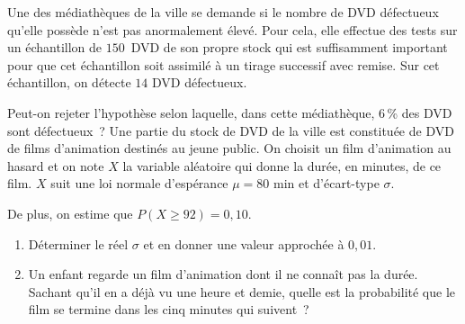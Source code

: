 \bigbreak
{}
\medbreak
Une des médiathèques de la ville se demande si le nombre de DVD défectueux qu'elle possède
n'est pas anormalement élevé. Pour cela, elle effectue des tests sur un échantillon de $150 $~DVD de son propre stock qui est suffisamment important pour que cet échantillon soit assimilé à un tirage successif avec remise. Sur cet échantillon, on détecte $14$ DVD défectueux.
\par
Peut-on rejeter l'hypothèse selon laquelle, dans cette médiathèque, 6\,\% des DVD sont défectueux~?
\bigbreak
{}
\medbreak
Une partie du stock de DVD de la ville est constituée de DVD de films d'animation destinés au jeune public. On choisit un film d'animation au hasard et on note $X$ la variable aléatoire qui donne la durée, en minutes, de ce film. $X$ suit une loi normale d'espérance $\mu = 80$ min et d'écart-type $\sigma$.
\par
De plus, on estime que $P(X \geqslant 92) = 0,10$.
\medbreak
\begin{enumerate}
     \item Déterminer le réel $\sigma$ et en donner une valeur approchée à $0,01$.
     \item Un enfant regarde un film d'animation dont il ne connaît pas la durée. Sachant qu'il en a déjà vu une heure et demie, quelle est la probabilité que le film se termine dans les cinq minutes qui suivent~?
\end{enumerate}

